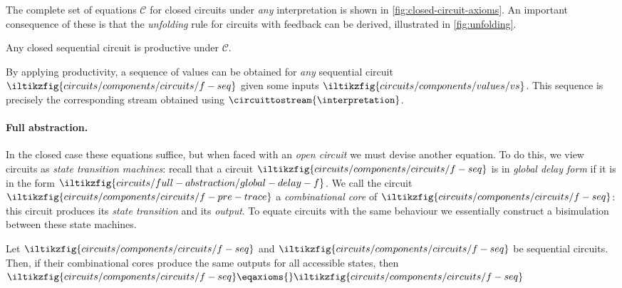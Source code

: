 \documentclass[10pt]{article}
\begin{document}
    \noindent
    The complete set of equations \(\mathcal{C}\) for closed circuits under \emph{any} interpretation is shown in \cref{fig:closed-circuit-axioms}.
    An important consequence of these is that the \emph{unfolding} rule for circuits with feedback can be derived, illustrated in \cref{fig:unfolding}.

    \begin{theorem}
        Any closed sequential circuit  is productive under \(\mathcal{C}\).
    \end{theorem}

    \noindent
    By applying productivity, a sequence of values can be obtained for \emph{any} sequential circuit \(\iltikzfig{circuits/components/circuits/f-seq}\) given some inputs \(\iltikzfig{circuits/components/values/vs}\).
    This sequence is precisely the corresponding stream obtained using \(\circuittostream{\interpretation}\).

    \paragraph*{Full abstraction.}

    In the closed case these equations suffice, but when faced with an \emph{open circuit} we must devise another equation.
    To do this, we view circuits as \emph{state transition machines}: recall that a circuit \(\iltikzfig{circuits/components/circuits/f-seq}\) is in \emph{global delay form} if it is in the form \(\iltikzfig{circuits/full-abstraction/global-delay-f}\).
    We call the circuit \(\iltikzfig{circuits/components/circuits/f-pre-trace}\) a \emph{combinational core} of \(\iltikzfig{circuits/components/circuits/f-seq}\): this circuit produces its \emph{state transition} and its \emph{output}.
    To equate circuits with the same behaviour we essentially construct a bisimulation between these state machines.

    \begin{proposition}
        Let \(\iltikzfig{circuits/components/circuits/f-seq}\) and \(\iltikzfig{circuits/components/circuits/f-seq}\) be sequential circuits. Then, if their combinational cores produce the same outputs for all accessible states, then \(\iltikzfig{circuits/components/circuits/f-seq} \eqaxioms{} \iltikzfig{circuits/components/circuits/f-seq}\)
    \end{proposition}
\end{document}
